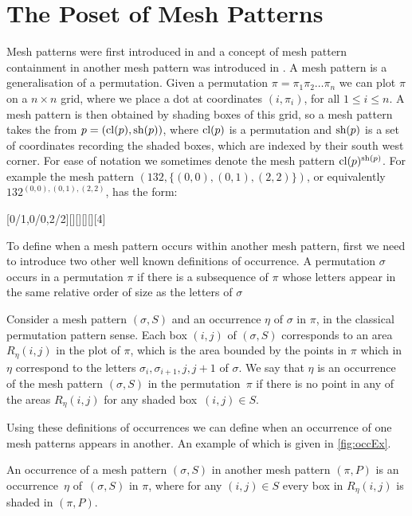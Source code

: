 \documentclass[11pt,a4paper,oneside]{article}
\begin{document}
\section{The Poset of Mesh Patterns}\label{sec:PosMP}
Mesh patterns were first introduced in \cite{Bra11} and a concept of mesh
pattern containment in another mesh pattern was introduced in \cite{TU17}. 
A mesh pattern is a generalisation of a permutation. Given a permutation
$\pi=\pi_1\pi_2\ldots\pi_n$ we can plot $\pi$ on a $n\times n$ grid,
where we place a dot at coordinates $(i,\pi_i)$, for all $1\le i\le n$.
A mesh pattern is then obtained by shading boxes of this grid, so a mesh
pattern takes the from $p=(\operatorname{\textrm{cl}}(p),\operatorname{\textrm{sh}}(p))$, where $\operatorname{\textrm{cl}}(p)$ is a permutation
and $\operatorname{\textrm{sh}}(p)$ is a set of coordinates recording the shaded boxes, which are indexed
by their south west corner. For ease of notation we sometimes denote the mesh
pattern $\operatorname{\textrm{cl}}(p)^{\operatorname{\textrm{sh}}(p)}$. For example the mesh pattern $(132,\{(0,0),(0,1),(2,2)\})$,
or equivalently $132^{(0,0),(0,1),(2,2)}$, has the form:
\begin{center}
[0/1,0/0,2/2][][][][][4]
\end{center}

To define when a mesh pattern occurs within another mesh pattern, first we need to
introduce two other well known definitions of occurrence. A permutation $\sigma$
occurs in a permutation $\pi$ if there is a subsequence of $\pi$ whose letters
appear in the same relative order of size as the letters of $\sigma$

Consider a mesh pattern $(\sigma,S)$ and an occurrence $\eta$ of $\sigma$ in $\pi$, in the
classical permutation pattern sense. Each box $(i,j)$ of $(\sigma,S)$ corresponds to an
area $R_{\eta}(i,j)$ in the plot of $\pi$, which is the area bounded by the points in $\pi$
which in $\eta$ correspond to the letters $\sigma_i,\sigma_{i+1},j,j+1$ of $\sigma$.
We say that $\eta$ is an occurrence of the mesh pattern $(\sigma,S)$ in the permutation~$\pi$
if there is no point in any of the areas $R_{\eta}(i,j)$ for any shaded box~$(i,j)\in S$.

Using these definitions of occurrences we can define when an occurrence of one mesh patterns
appears in another.  An example of which is given in \cref{fig:occEx}. 

\begin{defn}[\cite{TU17}]\label{defn:meshOcc}
An occurrence of a mesh pattern $(\sigma,S)$ in another mesh 
pattern $(\pi,P)$ is an occurrence~$\eta$ of~$(\sigma,S)$ in $\pi$, where for any $(i,j)\in S$
every box in $R_\eta(i,j)$ is shaded in $(\pi,P)$.
\end{defn}
\end{document}

